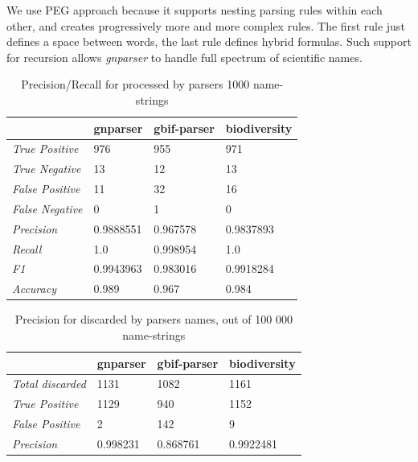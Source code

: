\documentclass{bmcart}
\begin{document}
\vspace{0.5cm}

We use PEG approach because it supports nesting parsing rules within each
other, and creates progressively more and more complex rules. The first rule
just defines a space between words, the last rule defines hybrid
formulas.  Such support for recursion allows \textit{gnparser} to handle full
spectrum of scientific names.

\begin{table}[htb]
  \begin{center}
    \caption{Precision/Recall for processed by parsers 1000
    name-strings}\label{table:precision}
    \resizebox{10cm}{!} {
    \begin{tabular}{|l|*{3}{l}|}
      \hline
                             & gnparser & gbif-parser & biodiversity \\
      \hline
      \textit{True Positive} & 976      & 955         & 971          \\
      \textit{True Negative} & 13       & 12          & 13           \\
      \textit{False Positive}& 11       & 32          & 16           \\
      \textit{False Negative}& 0        & 1           & 0            \\
      \textit{Precision}     & 0.9888551& 0.967578    & 0.9837893    \\
      \textit{Recall}        & 1.0      & 0.998954    & 1.0          \\
      \textit{F1}            & 0.9943963& 0.983016    & 0.9918284    \\
      \textit{Accuracy}      & 0.989    & 0.967       & 0.984        \\
      \hline
    \end{tabular}
    }
  \end{center}
\end{table}

\begin{table}[htb]
  \begin{center}
    \caption{Precision for discarded by parsers names, out of 100 000
    name-strings}\label{table:unparsed}
    \resizebox{10cm}{!} {
    \begin{tabular}{| l | *{3}{l} |}
      \hline
                              & gnparser & gbif-parser & biodiversity \\
      \hline
      \textit{Total discarded}& 1131     & 1082        & 1161         \\
      \textit{True Positive}  & 1129     & 940         & 1152         \\
      \textit{False Positive} & 2        & 142         & 9            \\
      \textit{Precision}      & 0.998231 & 0.868761    & 0.9922481    \\
      \hline
    \end{tabular}
  }
  \end{center}
\end{table}
\end{document}
